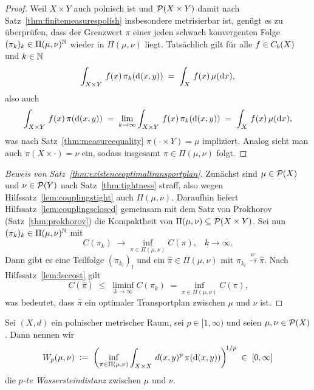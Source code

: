 \documentclass[../main/main.tex]{subfiles}
\begin{document}
	\begin{proof}
		Weil $X \times Y$ auch polnisch ist und $\mathcal{P}(X \times Y)$ damit nach Satz~\ref{thm:finitemeasurespolish} insbesondere metrisierbar ist, genügt es zu überprüfen, dass der Grenzwert $\pi$ einer jeden schwach konvergenten Folge $(\pi_k)_k \in \Pi(\mu, \nu)^{\mathbb{N}}$ wieder in $\Pi(\mu, \nu)$ liegt. Tatsächlich gilt für alle $f \in C_b(X)$ und $k \in \mathbb{N}$
		\[ \int_{X \times Y} \, f(x) \, \pi_k(\mathrm{d}(x, y)) \; = \; \int_{X} \, f(x) \, \mu(\mathrm{d}x) \text{,} \]
		also auch 
		\[ \int_{X \times Y} \, f(x) \, \pi(\mathrm{d}(x, y)) \; = \; \lim_{k \to \infty} \int_{X \times Y} \, f(x) \, \pi_k(\mathrm{d}(x, y)) \; = \; \int_{X} \, f(x) \, \mu(\mathrm{d}x) \text{,} \]
		was nach Satz~\ref{thm:measureequality} $\pi(\cdot \times Y) = \mu$ impliziert. Analog sieht man auch $\pi(X \times \cdot) = \nu$ ein, sodass insgesamt $\pi \in \Pi(\mu, \nu)$ folgt.
	\end{proof}

	\begin{proof}[Beweis von Satz~\ref{thm:existenceoptimaltransportplan}]
		Zunächst sind $\mu \in \mathcal{P}(X)$ und $\nu \in \mathcal{P}(Y)$ nach Satz~\ref{thm:tightness} straff, also wegen Hilfssatz~\ref{lem:couplingstight} auch 
		$\Pi(\mu, \nu)$. Daraufhin liefert Hilfssatz~\ref{lem:couplingsclosed} gemeinsam mit dem Satz von Prokhorov (Satz~\ref{thm:prokhorov}) die Kompaktheit von $\Pi(\mu, \nu) \subseteq \mathcal{P}(X \times Y)$.
		Sei nun $(\pi_k)_k \in \Pi(\mu, \nu)^{\mathbb{N}}$ mit
		\[ C(\pi_k) \; \to \inf_{\pi \in \Pi(\mu, \nu)} C(\pi) \text{,} \quad k \to \infty \text{.} \]
		Dann gibt es eine Teilfolge $(\pi_{k_l})_l$ und ein $\hat{\pi} \in \Pi(\mu, \nu)$ mit $\pi_{k_l} \xrightarrow{w} \hat{\pi}$. Nach Hilfssatz~\ref{lem:lsccost} gilt
		\[ C(\hat{\pi}) \; \leq \; \liminf_{k \to \infty} C(\pi_k) \; = \inf_{\pi \in \Pi(\mu, \nu)} C(\pi) \text{,} \]
		was bedeutet, dass $\hat{\pi}$ ein optimaler Transportplan zwischen $\mu$ und $\nu$ ist. 
	\end{proof}

	\begin{Definition}
		\label{def:wasserstein}
		Sei $(X, d)$ ein polnischer metrischer Raum, sei $p \in [1, \infty)$ und seien $\mu, \nu \in \mathcal{P}(X)$. Dann nennen wir
		$$ W_p(\mu, \nu) \; \vcentcolon = \; \left(\inf_{\pi \in \Pi(\mu, \nu)} \int_{X \times X} \, d(x, y)^p \, \pi(\mathrm{d}(x, y))\right)^{\! 1/p} \; \in \; [0, \infty] $$
		die \emph{$p$-te Wassersteindistanz} zwischen $\mu$ und $\nu$.
	\end{Definition}
\end{document}

